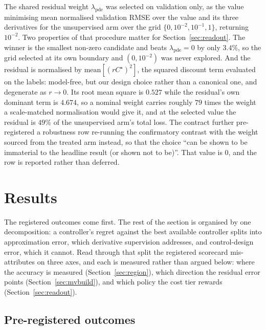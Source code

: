 \documentclass{article}
\begin{document}
The shared residual weight $\lambda_{\mathrm{pde}}$ was selected on validation only,
as the value minimising mean normalised validation RMSE over the value and its three
derivatives for the unsupervised arm over the grid $\{0, 10^{-2}, 10^{-1}, 1\}$,
returning $10^{-2}$. Two properties of that procedure matter for
Section~\ref{sec:readout}. The winner is the smallest non-zero candidate and beats
$\lambda_{\mathrm{pde}} = 0$ by only $3.4\%$, so the grid selected at its own
boundary and $(0, 10^{-2})$ was never explored. And the residual is normalised by $\mathrm{mean}[(rC^{\star})^{2}]$, the
squared discount term evaluated on the labels: model-free, but our design choice
rather than a canonical one, and degenerate as $r \to 0$. Its root mean square is
$0.527$ while the residual's own dominant term is $4.674$, so a nominal weight
carries roughly $79$ times the weight a scale-matched normalisation would give it,
and at the selected value the residual is $49\%$ of the unsupervised arm's total
loss. The contract further pre-registered a robustness row re-running the
confirmatory contrast with the weight sourced from the treated arm instead, so that
the choice ``can be shown to be immaterial to the headline result (or shown not to
be)''. That value is $0$, and the row is reported rather than deferred.

\section{Results}
\label{sec:results}

The registered outcomes come first. The rest of the section is organised by one
decomposition: a controller's regret against the best available controller splits
into approximation error, which derivative supervision addresses, and control-design
error, which it cannot. Read through that split the registered scorecard
mis-attributes on three axes, and each is measured rather than argued below: where
the accuracy is measured (Section~\ref{sec:region}), which direction the residual
error points (Section~\ref{sec:mvbuild}), and which policy the cost tier rewards
(Section~\ref{sec:readout}).

\subsection{Pre-registered outcomes}
\label{sec:reg}
\end{document}
